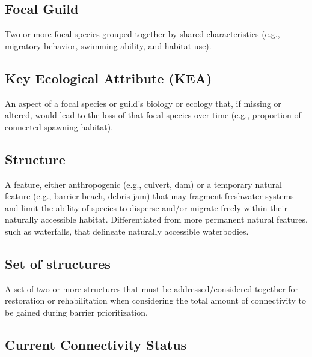 \documentclass[
  letterpaper,
  DIV=11,
  numbers=noendperiod]{scrreprt}
\begin{document}
\hypertarget{focal-guild}{%
\subsection*{Focal Guild}\label{focal-guild}}

Two or more focal species grouped together by shared characteristics
(e.g., migratory behavior, swimming ability, and habitat use).

\hypertarget{key-ecological-attribute-kea}{%
\subsection*{Key Ecological Attribute
(KEA)}\label{key-ecological-attribute-kea}}

An aspect of a focal species or guild's biology or ecology that, if
missing or altered, would lead to the loss of that focal species over
time (e.g., proportion of connected spawning habitat).

\hypertarget{structure}{%
\subsection*{Structure}\label{structure}}

A feature, either anthropogenic (e.g., culvert, dam) or a temporary
natural feature (e.g., barrier beach, debris jam) that may fragment
freshwater systems and limit the ability of species to disperse and/or
migrate freely within their naturally accessible habitat. Differentiated
from more permanent natural features, such as waterfalls, that delineate
naturally accessible waterbodies.

\hypertarget{set-of-structures}{%
\subsection*{Set of structures}\label{set-of-structures}}

A set of two or more structures that must be addressed/considered
together for restoration or rehabilitation when considering the total
amount of connectivity to be gained during barrier prioritization.

\hypertarget{current-connectivity-status-1}{%
\subsection*{Current Connectivity
Status}\label{current-connectivity-status-1}}
\end{document}

